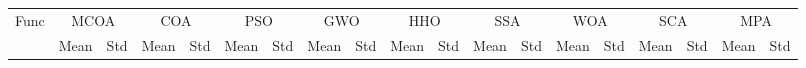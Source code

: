 \begin{tabular}{lrrrrrrrrrrrrrrrrrr}
\hline
Func & \multicolumn{2}{c}{MCOA} & \multicolumn{2}{c}{COA} & \multicolumn{2}{c}{PSO} & \multicolumn{2}{c}{GWO} & \multicolumn{2}{c}{HHO} & \multicolumn{2}{c}{SSA} & \multicolumn{2}{c}{WOA} & \multicolumn{2}{c}{SCA} & \multicolumn{2}{c}{MPA} \\
 & Mean & Std & Mean & Std & Mean & Std & Mean & Std & Mean & Std & Mean & Std & Mean & Std & Mean & Std & Mean & Std \\
\hline
\hline
\end{tabular}
